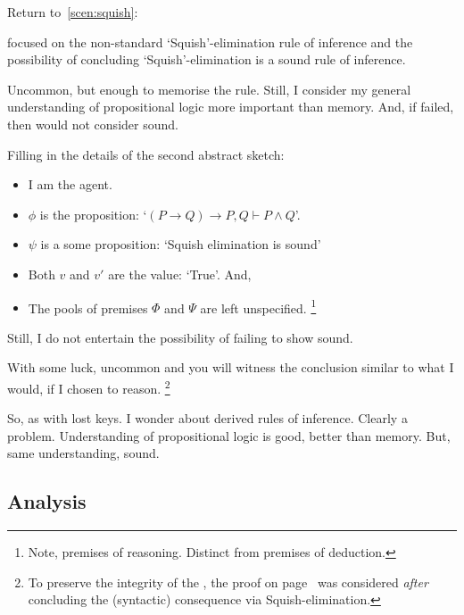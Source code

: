 \begin{note}
  Return to~\autoref{scen:squish}:

  \scenarioPLSquish*

   focused on the non-standard `Squish'-elimination rule of inference and the possibility of concluding `Squish'-elimination is a sound rule of inference.

  Uncommon, but enough to memorise the rule.
  Still, I consider my general understanding of propositional logic more important than memory.
  And, if failed, then would not consider sound.

  Filling in the details of the second abstract sketch:
  \begin{itemize}[noitemsep]
  \item
    I am the agent.
  \item
    \(\phi\) is the proposition: `\((P \rightarrow Q) \rightarrow P, Q \vdash P \land Q\)'.
  \item
    \(\psi\) is a some proposition: `Squish elimination is sound'
  \item
    Both \(v\) and \(v'\) are the value: `True'.
    And,
  \item
    The pools of premises \(\Phi\) and \(\Psi\) are left unspecified.%
    \footnote{
      Note, premises of reasoning.
      Distinct from premises of deduction.
    }
  \end{itemize}

  Still, I do not entertain the possibility of failing to show sound.

  With some luck, uncommon and you will witness the conclusion similar to what I would, if I chosen to reason.%
  \footnote{
    To preserve the integrity of the , the proof on page~\pageref{squish-elimination-proof} was considered \emph{after} concluding the (syntactic) consequence via Squish-elimination.
  }
\end{note}

\begin{note}
  So, as with lost keys.
  I wonder about derived rules of inference.
  Clearly a problem.
  Understanding of propositional logic is good, better than memory.
  But, same understanding, sound.
\end{note}

\subsection{Analysis}
\label{cha:zS:sec:lost-keys:analysis}


